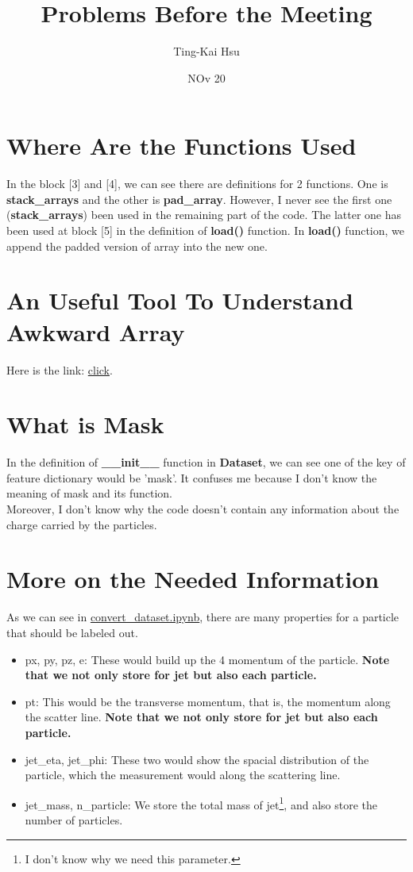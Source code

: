 \documentclass[12pt]{article}
\title{Problems Before the Meeting}
\author{Ting-Kai Hsu}
\date{NOv 20}
\numberwithin{equation}{section}
\begin{document}
\maketitle
\tableofcontents

\section{Where Are the Functions Used}

In the block [3] and [4], we can see there are definitions for 2 functions. One is \textbf{stack\_arrays} and the other is \textbf{pad\_array}. 
However, I never see the first one (\textbf{stack\_arrays}) been used in the remaining part of the code. 
The latter one has been used at block [5] in the definition of \textbf{load()} function. 
In \textbf{load()} function, we append the padded version of array into the new one.

\section{An Useful Tool To Understand Awkward Array}
Here is the link: \href{https://cms-opendata-workshop.github.io/workshop2022-lesson-cpp-root-python/08-awkward/}{click}.

\section{What is Mask}
In the definition of \textbf{\_\_init\_\_} function in \textbf{Dataset}, we can see one of the key of feature dictionary would be 'mask'. 
It confuses me because I don't know the meaning of mask and its function.\\\indent 
Moreover, I don't know why the code doesn't contain any information about the charge carried by the particles.

\section{More on the Needed Information}
As we can see in \href{https://github.com/hqucms/ParticleNet/blob/master/tf-keras/convert_dataset.ipynb}{convert\_dataset.ipynb}, there are many properties for a particle that should be labeled out.

\begin{itemize}
    \item px, py, pz, e: These would build up the 4 momentum of the particle. \textbf{Note that we not only store for jet but also each particle. }
    \item pt: This would be the transverse momentum, that is, the momentum along the scatter line. \textbf{Note that we not only store for jet but also each particle.}
    \item jet\_eta, jet\_phi: These two would show the spacial distribution of the particle, which the measurement would along the scattering line.
    \item jet\_mass, n\_particle: We store the total mass of jet\footnote{I don't know why we need this parameter.}, and also store the number of particles.
\end{itemize}
\end{document}
